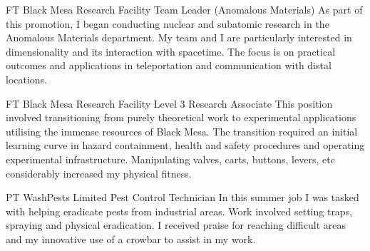\documentclass[10pt]{article} %
\begin{document}
\begin{paracol}{2}
	
	
	
	
	{FT} %
	{Black Mesa Research Facility} %
	{Team Leader (Anomalous Materials)} %
	{As part of this promotion, I began conducting nuclear and subatomic research in the Anomalous Materials department. My team and I are particularly interested in dimensionality and its interaction with spacetime. The focus is on practical outcomes and applications in teleportation and communication with distal locations.} %
	
	
	{FT} %
	{Black Mesa Research Facility} %
	{Level 3 Research Associate} %
	{This position involved transitioning from purely theoretical work to experimental applications utilising the immense resources of Black Mesa. The transition required an initial learning curve in hazard containment, health and safety procedures and operating experimental infrastructure. Manipulating valves, carts, buttons, levers, etc considerably increased my physical fitness.}  %
	
	
	{PT} %
	{WashPests Limited} %
	{Pest Control Technician} %
	{In this summer job I was tasked with helping eradicate pests from industrial areas. Work involved setting traps, spraying and physical eradication. I received praise for reaching difficult areas and my innovative use of a crowbar to assist in my work.} %
	
	
	\vspace{-\baselineskip}\medskip %
	

\end{paracol}
\end{document}
